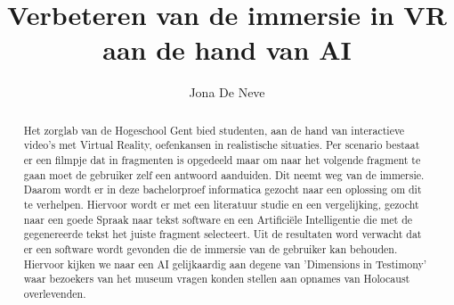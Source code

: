 \documentclass{hogent-article}
\title{Verbeteren van de immersie in VR aan de hand van AI}
\author{Jona De Neve}
\begin{document}
\begin{abstract}

Het zorglab van de Hogeschool Gent bied studenten, aan de hand van interactieve video's met Virtual Reality, oefenkansen in realistische situaties. Per scenario bestaat er een filmpje dat in fragmenten is opgedeeld maar om naar het volgende fragment te gaan moet de gebruiker zelf een antwoord aanduiden. Dit neemt weg van de immersie. Daarom wordt er in deze bachelorproef informatica gezocht naar een oplossing om dit te verhelpen. Hiervoor wordt er met een literatuur studie en een vergelijking, gezocht naar een goede Spraak naar tekst software en een Artificiële Intelligentie die met de gegenereerde tekst het juiste fragment selecteert. Uit de resultaten word verwacht dat er een software wordt gevonden die de immersie van de gebruiker kan behouden. Hiervoor kijken we naar een AI gelijkaardig aan degene van 'Dimensions in Testimony' waar bezoekers van het museum vragen konden stellen aan opnames van Holocaust overlevenden.

\end{abstract}

\tableofcontents



\printbibliography[heading=bibintoc]
\end{document}
